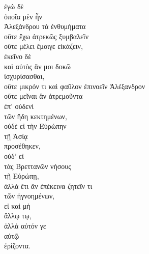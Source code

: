 {\large
\begin{greek}
\noindent  ἐγὼ δὲ \\
\tabto{2em} ὁποῖα μὲν ἦν \\
\tabto{4em} Ἀλεξάνδρου τὰ ἐνθυμήματα \\
οὔτε ἔχω ἀτρεκῶς ξυμβαλεῖν \\
οὔτε μέλει ἔμοιγε εἰκάζειν, \\
\tabto{2em} ἐκεῖνο δὲ \\
\tabto{2em} καὶ αὐτὸς ἄν μοι δοκῶ \\
\tabto{4em} ἰσχυρίσασθαι, \\
\tabto{4em} οὔτε μικρόν τι καὶ φαῦλον ἐπινοεῖν Ἀλέξανδρον \\
\tabto{4em} οὔτε μεῖναι ἂν ἀτρεμοῦντα \\
\tabto{6em} ἐπ' οὐδενὶ \\
\tabto{8em} τῶν ἤδη κεκτημένων, \\
\tabto{4em} οὐδὲ εἰ τὴν Εὐρώπην \\
\tabto{6em} τῇ Ἀσίᾳ \\
\tabto{4em} προσέθηκεν, \\
\tabto{4em} οὐδ' εἰ \\
\tabto{4em} τὰς Βρεττανῶν νήσους \\
\tabto{6em} τῇ Εὐρώπῃ, \\
\tabto{4em} ἀλλὰ ἔτι ἂν ἐπέκεινα ζητεῖν τι \\
\tabto{6em} τῶν ἠγνοημένων, \\
\tabto{4em} εἰ καὶ μὴ \\
\tabto{6em} ἄλλῳ τῳ, \\
\tabto{4em} ἀλλὰ αὐτόν γε \\
\tabto{6em} αὑτῷ \\
\tabto{4em} ἐρίζοντα.\\

\end{greek}
}

